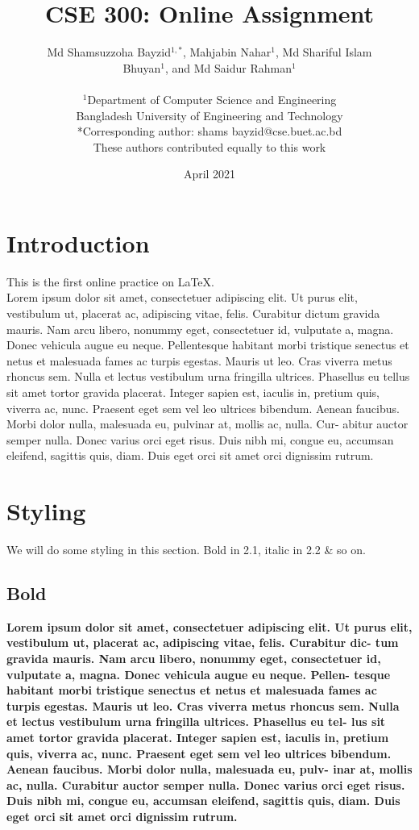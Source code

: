 \documentclass[12pt, a4paper]{article} %
\title{CSE 300: Online Assignment}
\author{Md Shamsuzzoha Bayzid$^{1,*}$, Mahjabin Nahar$^{1}$, Md Shariful Islam\\ Bhuyan$^{1}$, and Md Saidur Rahman$^{1}$ \\ \\
	$^1$Department of Computer Science and Engineering \\
	Bangladesh University of Engineering and Technology \\
	*Corresponding author: shams bayzid@cse.buet.ac.bd \\
	These authors contributed equally to this work
}
\date{April 2021}
\begin{document}
	\maketitle
	\tableofcontents
	\section{Introduction}
This is the first online practice on LaTeX. \\
Lorem ipsum dolor sit amet, consectetuer adipiscing elit. Ut purus elit,
vestibulum ut, placerat ac, adipiscing vitae, felis. Curabitur dictum gravida
mauris. Nam arcu libero, nonummy eget, consectetuer id, vulputate a, magna.
Donec vehicula augue eu neque. Pellentesque habitant morbi tristique senectus
et netus et malesuada fames ac turpis egestas. Mauris ut leo. Cras viverra
metus rhoncus sem. Nulla et lectus vestibulum urna fringilla ultrices. Phasellus
eu tellus sit amet tortor gravida placerat. Integer sapien est, iaculis in, pretium
quis, viverra ac, nunc. Praesent eget sem vel leo ultrices bibendum. Aenean
faucibus. Morbi dolor nulla, malesuada eu, pulvinar at, mollis ac, nulla. Cur-
abitur auctor semper nulla. Donec varius orci eget risus. Duis nibh mi, congue
eu, accumsan eleifend, sagittis quis, diam. Duis eget orci sit amet orci dignissim
rutrum.

\pagebreak
	
\section{Styling}
We will do some styling in this section. Bold in 2.1, italic in 2.2 \& so on.

\subsection{Bold}
\textbf{Lorem ipsum dolor sit amet, consectetuer adipiscing elit. Ut purus
	elit, vestibulum ut, placerat ac, adipiscing vitae, felis. Curabitur dic-
	tum gravida mauris. Nam arcu libero, nonummy eget, consectetuer
	id, vulputate a, magna. Donec vehicula augue eu neque. Pellen-
	tesque habitant morbi tristique senectus et netus et malesuada fames
	ac turpis egestas. Mauris ut leo. Cras viverra metus rhoncus sem.
	Nulla et lectus vestibulum urna fringilla ultrices. Phasellus eu tel-
	lus sit amet tortor gravida placerat. Integer sapien est, iaculis in,
	pretium quis, viverra ac, nunc. Praesent eget sem vel leo ultrices
	bibendum. Aenean faucibus. Morbi dolor nulla, malesuada eu, pulv-
	inar at, mollis ac, nulla. Curabitur auctor semper nulla. Donec varius
	orci eget risus. Duis nibh mi, congue eu, accumsan eleifend, sagittis
	quis, diam. Duis eget orci sit amet orci dignissim rutrum.
}
	
\end{document}
